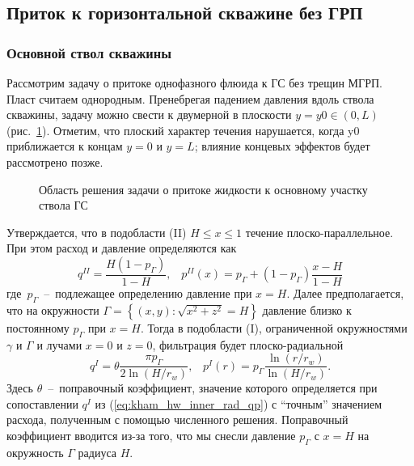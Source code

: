 \documentclass{article}
\begin{document}

\subsection{Приток к горизонтальной скважине без ГРП}

\subsubsection{Основной ствол скважины}
Рассмотрим задачу о притоке однофазного флюида к ГС без трещин МГРП. Пласт
считаем однородным. Пренебрегая падением давления вдоль ствола скважины,
задачу можно свести к двумерной в плоскости $y = y0 \in \left(0, L\right)$
(рис.~\ref{fig:kham_well_pipe_scheme}). Отметим, что плоский характер течения
нарушается, когда y0 приближается к концам $y = 0$ и $y = L$; влияние концевых
эффектов будет рассмотрено позже.

\begin{figure}[!ht]
  \centering
  
  \caption{Область решения задачи о притоке жидкости к основному участку ствола ГС}
  \label{fig:kham_well_pipe_scheme}
\end{figure}

Утверждается, что в подобласти (II) $H \leq x \leq 1$ течение плоско-параллельное.
При этом расход и давление определяются как
\begin{equation}
  \displaystyle
  q^{II} = \dfrac{H \left(1-p_{\Gamma}\right)}{1-H}, \;\;\;
  p^{II}(x) = p_{\Gamma} + (1 - p_{\Gamma})\dfrac{x - H}{1-H}
  \label{eq:kham_hw_inner_par_qp}
\end{equation}
где~$p_{\Gamma}$~--~подлежащее определению давление при $x=H$.
Далее предполагается, что на окружности
$\Gamma=\left\{\left(x,y\right): \sqrt{x^2 + z^2} = H \right\}$
давление близко к постоянному $p_{\Gamma}$ при $x=H$.
Тогда в подобласти (I), ограниченной окружностями $\gamma$ и $\Gamma$ и
лучами $x = 0$ и $z = 0$, фильтрация будет плоско-радиальной
\begin{equation}
  \displaystyle
  q^I = \theta \dfrac{\pi p_{\Gamma}}{2 \ln{\left(H/r_w\right)}}, \;\;\;
  p^I(r) = p_{\Gamma} \dfrac{\ln{\left(r/r_w\right)}}{\ln{\left(H/r_w\right)}}.
  \label{eq:kham_hw_inner_rad_qp}
\end{equation}
Здесь $\theta$~--~поправочный коэффициент, значение которого определяется
при сопоставлении $q^I$ из (\ref{eq:kham_hw_inner_rad_qp}) с ``точным''
значением расхода, полученным с помощью численного решения. Поправочный
коэффициент вводится из-за того, что мы снесли давление $p_{\Gamma}$ с $x= H$
на окружность $\Gamma$ радиуса $H$.
\end{document}
